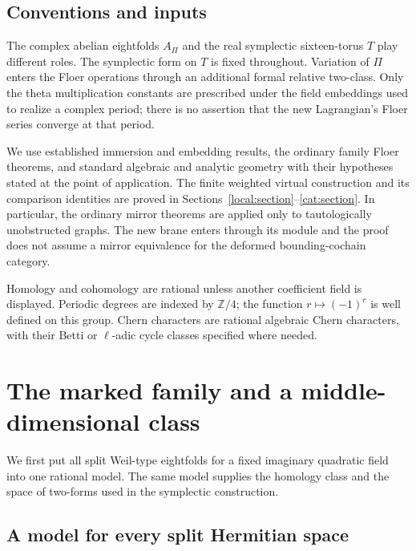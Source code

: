 \documentclass[11pt]{article}
\theoremstyle{definition}
\theoremstyle{remark}
\newcommand{\Z}{\mathbb Z}
\numberwithin{equation}{section}
\begin{document}
\subsection{Conventions and inputs}

The complex abelian eightfolds $A_\Pi$ and the real symplectic
sixteen-torus $T$ play different roles.  The symplectic form on $T$ is
fixed throughout.  Variation of $\Pi$ enters the Floer operations through
an additional formal relative two-class.  Only the theta multiplication
constants are prescribed under the field embeddings used to realize a
complex period; there is no assertion that the new Lagrangian's Floer
series converge at that period.

We use established immersion and embedding results, the ordinary
family Floer theorems, and standard algebraic and analytic geometry with
their hypotheses stated at the point of application.  The finite
weighted virtual construction and its comparison identities are proved
in Sections~\ref{local:section}--\ref{cat:section}.  In particular, the
ordinary mirror theorems are applied only to tautologically unobstructed
graphs.  The new brane enters through its module and the proof does not
assume a mirror equivalence for the deformed bounding-cochain category.

Homology and cohomology are rational unless another coefficient field is
displayed.  Periodic degrees are indexed by $\Z/4$; the function
$r\mapsto(-1)^r$ is well defined on this group.  Chern characters are
rational algebraic Chern characters, with their Betti or $\ell$-adic
cycle classes specified where needed.

\section{The marked family and a middle-dimensional class}
\label{hodge:section}

We first put all split Weil-type eightfolds for a fixed imaginary quadratic
field into one rational model.  The same model supplies the homology class
and the space of two-forms used in the symplectic construction.

\subsection{A model for every split Hermitian space}
\end{document}
